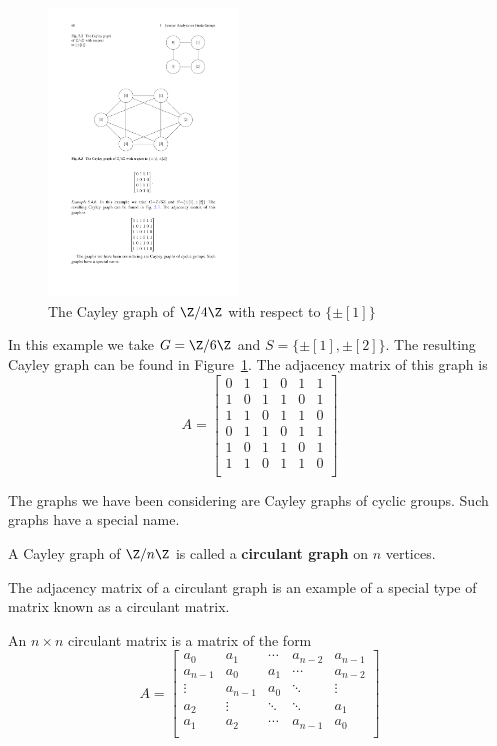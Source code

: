 \begin{figure}[htbp]
\centering
\includegraphics[width=0.45\textwidth]{pictures/Cayley-2.pdf}
\caption{The Cayley graph of $\Z/4\Z$ with respect to $\{\pm[1]\}$}
\label{Cayley graph eg-2}
\end{figure}
\begin{example}
In this example we take $G=\Z/6\Z$ and $S=\{\pm[1],\pm[2]\}$. The resulting Cayley graph can be found in Figure~\ref{Cayley graph eg-2}. The adjacency matrix of this graph is
\[A=\begin{bmatrix}
0&1&1&0&1&1\\
1&0&1&1&0&1\\
1&1&0&1&1&0\\
0&1&1&0&1&1\\
1&0&1&1&0&1\\
1&1&0&1&1&0\\
\end{bmatrix}\]
\end{example}
The graphs we have been considering are Cayley graphs of cyclic groups. Such
graphs have a special name.
\begin{definition}
A Cayley graph of $\Z/n\Z$ is called a \textbf{circulant graph} on $n$ vertices.
\end{definition}
The adjacency matrix of a circulant graph is an example of a special type of
matrix known as a circulant matrix.
\begin{definition}
An $n\times n$ circulant matrix is a matrix of the form
\[A=\begin{bmatrix}
a_0&a_1&\cdots&a_{n-2}&a_{n-1}\\
a_{n-1}&a_0&a_{1}&\cdots&a_{n-2}\\
\vdots&a_{n-1}&a_0&\ddots&\vdots\\
a_2&\vdots&\ddots&\ddots&a_{1}\\
a_1&a_2&\cdots&a_{n-1}&a_{0}\\
\end{bmatrix}\]
\end{definition}
